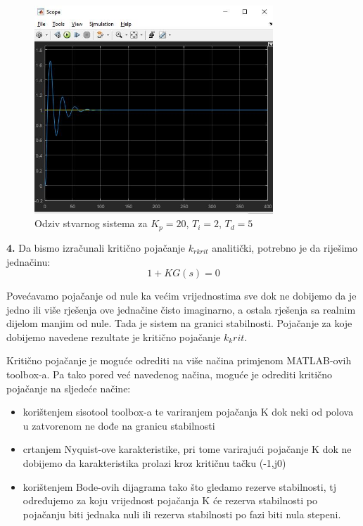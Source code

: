 \begin{figure} [H]
  \centering
  \includegraphics[width=0.8\textwidth]{z1_9}
  \caption{Odziv stvarnog sistema za $K_p=20$, $T_i=2$, $T_d=5$}
  \label{fig:z1_9}
\end{figure}

\textbf{4.} Da bismo izračunali kritično pojačanje $k_{rkrit}$ analitički, potrebno je da riješimo jednačinu:
	\[1+KG(s)=0	\]

Povećavamo pojačanje od nule ka većim vrijednostima sve dok ne dobijemo da je jedno ili više rješenja ove jednačine čisto imaginarno, a ostala rješenja sa realnim dijelom manjim od nule. Tada je sistem na granici stabilnosti. Pojačanje za koje dobijemo navedene rezultate je kritično pojačanje $k_krit$.

Kritično pojačanje je moguće odrediti na više načina primjenom MATLAB-ovih toolbox-a. Pa tako pored već navedenog načina, moguće je odrediti kritično pojačanje na sljedeće načine:
	\begin{itemize}
	    \item korištenjem sisotool toolbox-a te variranjem pojačanja K dok neki od polova u zatvorenom ne dođe na granicu stabilnosti
	    \item crtanjem Nyquist-ove karakteristike, pri tome varirajući pojačanje K dok ne dobijemo da karakteristika prolazi kroz kritičnu tačku (-1,j0)
	    \item korištenjem Bode-ovih dijagrama tako što gledamo rezerve stabilnosti, tj određujemo za koju vrijednost pojačanja K će rezerva stabilnosti po pojačanju biti jednaka nuli ili rezerva stabilnosti po fazi biti nula stepeni.
	\end{itemize}
	
